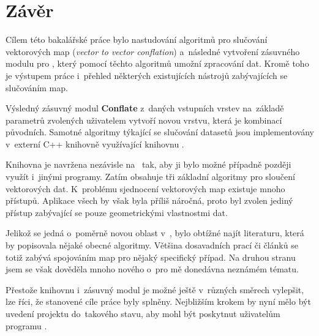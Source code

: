 \chapter{Závěr}
\label{9-zaver}

Cílem této bakalářské práce bylo nastudování algoritmů pro
slučování vektorových map (\textit{vector to vector conflation})
a~následné vytvoření zásuvného modulu pro , 
který pomocí těchto algoritmů umožní zpracování dat. Kromě 
toho je výstupem práce i~přehled některých existujících 
nástrojů zabývajících se slučováním map.

Výsledný zásuvný modul \textbf{Conflate} z~daných vstupních 
vrstev na~základě para\-metrů zvolených uživatelem vytvoří novou 
vrstvu, která je kombinací původních. Samotné algoritmy týkající 
se slučování datasetů jsou implementovány v~externí C++ knihovně
 využívající knihovnu . 

Knihovna  je navržena nezávisle na~  tak, 
aby ji bylo možné případně později využít i~jinými programy. Zatím
obsahuje tři základní algoritmy pro sloučení vektorových dat. 
K~problému sjednocení vektorových map existuje mnoho přístupů. 
Aplikace všech by však byla příliš náročná, proto byl zvolen jediný 
přístup zabývající se pouze geometrickými vlastnostmi dat.


Jelikož se jedná o~poměrně novou oblast v~, bylo
obtížné najít literaturu, která by popisovala nějaké obecné 
algoritmy. Většina dosavadních prací či článků se totiž zabývá 
spojováním map pro nějaký specifický případ. Na druhou stranu
jsem se však dověděla mnoho nového o~pro mě donedávna neznámém
tématu.

Přestože knihovnu i~zásuvný modul je možné ještě v~různých směrech 
vylepšit, lze říci, že stanovené cíle práce byly splněny. Nejbližším
krokem by nyní mělo být uvedení projektu do~takového stavu, aby 
mohl být poskytnut uživatelům programu .